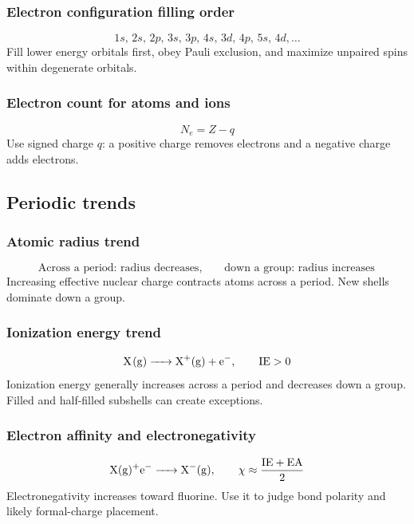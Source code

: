 \subsubsection{Electron configuration filling order}
\begin{equation}
1s,\,2s,\,2p,\,3s,\,3p,\,4s,\,3d,\,4p,\,5s,\,4d,\ldots
\label{eq:electronic:filling-order}
\end{equation}
Fill lower energy orbitals first, obey Pauli exclusion, and maximize unpaired spins within degenerate orbitals.

\subsubsection{Electron count for atoms and ions}
\begin{equation}
N_e=Z-q
\label{eq:electronic:ion-electron-count}
\end{equation}
Use signed charge \(q\): a positive charge removes electrons and a negative charge adds electrons.

\subsection{Periodic trends}

\subsubsection{Atomic radius trend}
\begin{equation}
\text{Across a period: radius decreases}, \qquad \text{down a group: radius increases}
\label{eq:electronic:atomic-radius-trend}
\end{equation}
Increasing effective nuclear charge contracts atoms across a period. New shells dominate down a group.

\subsubsection{Ionization energy trend}
\begin{equation}
\ce{X(g) -> X+(g) + e-}, \qquad \mathrm{IE}>0
\label{eq:electronic:ionization-definition}
\end{equation}
Ionization energy generally increases across a period and decreases down a group. Filled and half-filled subshells can create exceptions.

\subsubsection{Electron affinity and electronegativity}
\begin{equation}
\ce{X(g)+e- -> X-(g)}, \qquad \chi\approx\frac{\mathrm{IE}+\mathrm{EA}}{2}
\label{eq:electronic:affinity-electronegativity}
\end{equation}
Electronegativity increases toward fluorine. Use it to judge bond polarity and likely formal-charge placement.

